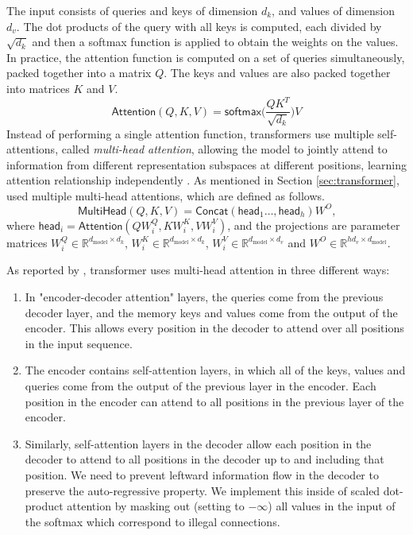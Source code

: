 \documentclass{article}
\begin{document}
	The input consists of queries and keys of dimension $d_k$, and values of dimension $d_v$. The dot 
	products of the query with all keys is computed, each divided by $\sqrt{d_k}$ and then a 
	softmax function is applied to obtain the weights on the values.
	In practice, the attention function is computed on a set of queries simultaneously, packed together 
	into a matrix $Q$. The keys and values are also packed together into matrices $K$ and $V$. 
	\begin{equation}
		\label{eqn:attention}
		\mathsf{Attention}(Q, K, V) = \mathsf{softmax} \big( \frac{QK^T}{\sqrt{d_k}}\big)V
	\end{equation}
	Instead of performing a single attention function, transformers use multiple self-attentions, called 
	\textit{multi-head attention}, allowing the model to jointly attend to information from different 
	representation subspaces at different positions, learning attention relationship independently	
	\cite{vaswani2017attention}.
	As mentioned in	Section \ref{sec:transformer}, \citet{vaswani2017attention} used multiple 
	multi-head 
	attentions, which are defined as follows.
	\begin{equation}
		\label{eqn:multihead}
		{\mathsf{MultiHead}(Q, K, V) = \mathsf{Concat}(\mathsf{head}_1 \dots, 
			\mathsf{head}_h) W^O }
		\mbox{,}
	\end{equation}
	where $ \mathsf{head}_i = \mathsf{Attention}(QW_i^Q, KW_i^K , VW_i^V)$, and the 
	projections are parameter matrices $W_i^Q \in \mathbb{R}^{d_{\text{model}}\times 
	d_k}$, $W_i^K \in \mathbb{R}^{d_{\text{model}}\times d_k}$, $W_i^V \in 
	\mathbb{R}^{d_{\text{model}}\times d_v}$ and $W^O \in \mathbb{R}^{hd_v \times 
	d_{\text{model}}}$.

	As reported by \cite{vaswani2017attention}, transformer uses multi-head attention in three 
	different 
	ways:
	\begin{enumerate}
		\item In "encoder-decoder attention" layers, the queries come from the previous decoder 
		layer, 
		and the memory keys and values come from the output of the encoder. This allows every 
		position in the decoder to attend over all positions in the input sequence.
		\item The encoder contains self-attention layers, in which all of the keys, values 
		and queries come from the output of the previous layer in the encoder. 
		Each position in the encoder can attend to all positions in the previous layer of the encoder.
		\item Similarly, self-attention layers in the decoder allow each position in the decoder to 
		attend 
		to all positions in the decoder up to and including that position. We need to prevent leftward 
		information flow in the decoder to preserve the auto-regressive property. We implement 
		this 
		inside of scaled dot-product attention by masking out (setting to $-\infty$) all values in the 
		input of the softmax which correspond to illegal connections. 
	\end{enumerate}
	
\end{document}
